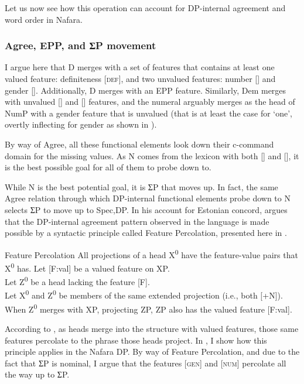\documentclass[output=paper]{langscibook}
\begin{document}
Let us now see how this operation can account for DP-internal agreement and word order in Nafara.


\subsubsection{Agree, EPP, and ƩP movement}

I argue here that D merges with a set of features that contains at least one valued feature: definiteness [\textsc{def}], and two unvalued features: number [{\NUM}] and gender [{\GEN}]. Additionally, D merges with an EPP feature. Similarly, Dem merges with unvalued [{\NUM}] and [{\GEN}] features, and the numeral arguably merges as the head of NumP with a gender feature that is unvalued (that is at least the case for ‘one’, overtly inflecting for gender as shown in ).  

By way of Agree, all these functional elements look down their c-command domain for the missing values. As N comes from the lexicon with both [{\NUM}] and [{\GEN}], it is the best possible goal for all of them to probe down to. 

While N is the best potential goal, it is ƩP that moves up. In fact, the same Agree relation through which DP-internal functional elements probe down to N selects ƩP to move up to Spec,DP. In his account for Estonian concord, \citet{Norris2014} argues that the DP-internal agreement pattern observed in the language is made possible by a syntactic principle called Feature Percolation, presented here in .


\begin{exe}\ex\label{ex:baron:19}
Feature Percolation \citep[135 (242)]{Norris2014}
\xlista
\ex All projections of a head X\textsuperscript{0} have the feature-value pairs that X\textsuperscript{0} has.
\ex Let [F:val] be a valued feature on XP.\\
   Let Z\textsuperscript{0} be a head lacking the feature [F].\\
   Let X\textsuperscript{0} and Z\textsuperscript{0} be members of the same extended projection (i.e., both [+N]).\\
   When Z\textsuperscript{0} merges with XP, projecting ZP, ZP also has the valued feature [F:val].
\endxlista
\end{exe}


According to , as heads merge into the structure with valued features, those same features percolate to the phrase those heads project. In , I show how this principle applies in the Nafara DP. By way of Feature Percolation, and due to the fact that ƩP is nominal, I argue that the features \textsc{[gen]} and \textsc{[num]} percolate all the way up to ƩP. 
\end{document}
